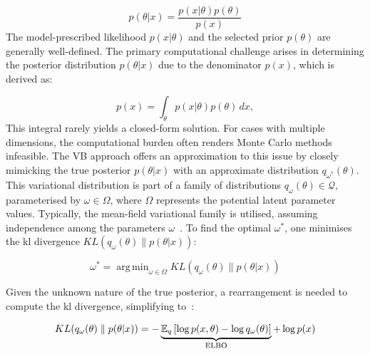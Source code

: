\documentclass[3p,review,authoryear]{elsarticle}
\DeclareMathOperator*{\argmin}{arg\,min}
\begin{document}
\begin{equation}
p(\theta|x)=\frac{p(x|\theta)p(\theta)}{p(x)}
\label{eq:bayes_rule}
\end{equation}
The model-prescribed likelihood $p(x|\theta)$ and the selected prior $p(\theta)$ are generally well-defined.
The primary computational challenge arises in determining the posterior distribution $p(\theta|x)$ due to the denominator $p(x)$, which is derived as:

\begin{equation}
p(x)=\int_{\theta} p(x|\theta)p(\theta) \,dx,
\label{eq:evidence}
\end{equation}
This integral rarely yields a closed-form solution.
For cases with multiple dimensions, the computational burden often renders Monte Carlo methods infeasible.
The VB approach offers an approximation to this issue by closely mimicking the true posterior $p(\theta|x)$ with an approximate distribution $q_{\omega^*}(\theta)$. This variational distribution is part of a family of distributions $q_\omega(\theta)\in \mathcal{Q}$, parameterised by $\omega \in \Omega$, where $\Omega$ represents the potential latent parameter values.
Typically, the mean-field variational family is utilised, assuming independence among the parameters $\omega$~\citep{Blei_2017}. 
To find the optimal $\omega^*$, one minimises the \gls{kl} divergence $KL(q_\omega(\theta) \parallel p(\theta|x))$:

\begin{equation}
\omega^* = \argmin_{\omega \in \Omega}KL(q_\omega(\theta) \parallel p(\theta|x))
\label{eq:optim}
\end{equation}

Given the unknown nature of the true posterior, a rearrangement is needed to compute the \gls{kl} divergence, simplifying to~\citep[Chapter~10]{murphy2023probabilistic}:

\begin{equation}
KL(q_\omega(\theta) \parallel p(\theta|x)) = -\underbrace{\mathbb{E}_q\left[\log p(x,\theta) - \log q_\omega(\theta)\right]}_{\text{ELBO}}+ \log p(x)\\
\label{eq:kl_divergence}
\end{equation}
\end{document}
